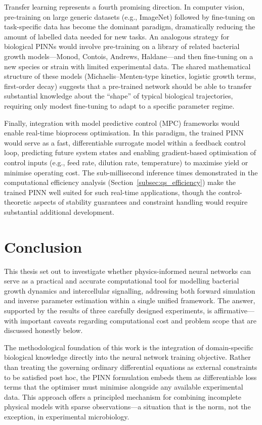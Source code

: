 \documentclass[14pt,a4paper,openany]{extbook}
\begin{document}
Transfer learning represents a fourth promising direction. In computer vision, pre-training on large generic datasets (e.g., ImageNet) followed by fine-tuning on task-specific data has become the dominant paradigm, dramatically reducing the amount of labelled data needed for new tasks. An analogous strategy for biological PINNs would involve pre-training on a library of related bacterial growth models---Monod, Contois, Andrews, Haldane---and then fine-tuning on a new species or strain with limited experimental data. The shared mathematical structure of these models (Michaelis--Menten-type kinetics, logistic growth terms, first-order decay) suggests that a pre-trained network should be able to transfer substantial knowledge about the ``shape'' of typical biological trajectories, requiring only modest fine-tuning to adapt to a specific parameter regime.

Finally, integration with model predictive control (MPC) frameworks would enable real-time bioprocess optimisation. In this paradigm, the trained PINN would serve as a fast, differentiable surrogate model within a feedback control loop, predicting future system states and enabling gradient-based optimisation of control inputs (e.g., feed rate, dilution rate, temperature) to maximise yield or minimise operating cost. The sub-millisecond inference times demonstrated in the computational efficiency analysis (Section~\ref{subsec:qs_efficiency}) make the trained PINN well suited for such real-time applications, though the control-theoretic aspects of stability guarantees and constraint handling would require substantial additional development.

\chapter{Conclusion}
\label{chap:conclusion}

This thesis set out to investigate whether physics-informed neural networks can serve as a practical and accurate computational tool for modelling bacterial growth dynamics and intercellular signalling, addressing both forward simulation and inverse parameter estimation within a single unified framework. The answer, supported by the results of three carefully designed experiments, is affirmative---with important caveats regarding computational cost and problem scope that are discussed honestly below.

The methodological foundation of this work is the integration of domain-specific biological knowledge directly into the neural network training objective. Rather than treating the governing ordinary differential equations as external constraints to be satisfied post hoc, the PINN formulation embeds them as differentiable loss terms that the optimiser must minimise alongside any available experimental data. This approach offers a principled mechanism for combining incomplete physical models with sparse observations---a situation that is the norm, not the exception, in experimental microbiology.
\end{document}
